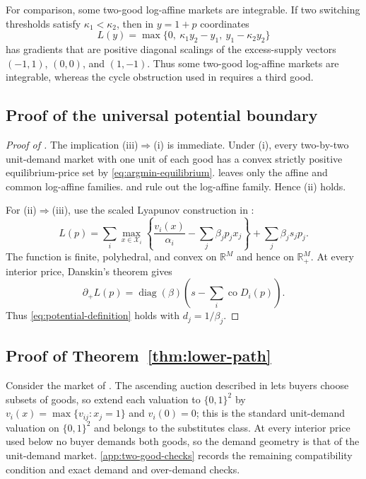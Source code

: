 \documentclass[11pt,a4paper,fleqn]{article}
\theoremstyle{plain}
\theoremstyle{definition}
\newcommand{\R}{\mathbb{R}}
\newcommand{\co}{\operatorname{co}}
\newcommand{\diag}{\operatorname{diag}}
\newcommand{\Xcal}{\mathcal{X}}
\begin{document}
For comparison, some two-good log-affine markets are integrable. If two switching thresholds satisfy $\kappa_1<\kappa_2$, then in $y=1+p$ coordinates
\[
L(y)=\max\{0,\ \kappa_1y_2-y_1,\ y_1-\kappa_2y_2\}
\]
has gradients that are positive diagonal scalings of the excess-supply vectors $(-1,1)$, $(0,0)$, and $(1,-1)$. Thus some two-good log-affine markets are integrable, whereas the cycle obstruction used in  requires a third good.

\subsection{Proof of the universal potential boundary}\label{subsec:potential-proof}

\begin{proof}[Proof of ]
The implication (iii)$\Rightarrow$(i) is immediate. Under (i), every two-by-two unit-demand market with one unit of each good has a convex strictly positive equilibrium-price set by \eqref{eq:argmin-equilibrium}.  leaves only the affine and common log-affine families.  and  rule out the log-affine family. Hence (ii) holds.

For (ii)$\Rightarrow$(iii), use the scaled Lyapunov construction in \citet[Theorem~6.4]{okisato2026}:
\begin{equation}\label{eq:affine-L}
L(p)=
\sum_i\max_{x\in\Xcal_i}
\left\{\frac{v_i(x)}{\alpha_i}-\sum_j\beta_jp_jx_j\right\}
+\sum_j\beta_js_jp_j.
\end{equation}
The function is finite, polyhedral, and convex on $\R^M$ and hence on $\R_+^M$. At every interior price, Danskin's theorem gives
\[
\partial_+ L(p)=\diag(\beta)
\left(s-\sum_i\co D_i(p)\right).
\]
Thus \eqref{eq:potential-definition} holds with $d_j=1/\beta_j$.
\end{proof}

\subsection{Proof of Theorem~\ref{thm:lower-path}}\label{subsec:lower-path-proof}

Consider the market of . The ascending auction described in  lets buyers choose subsets of goods, so extend each valuation to $\{0,1\}^2$ by $v_i(x)=\max\{v_{ij}:x_j=1\}$ and $v_i(0)=0$; this is the standard unit-demand valuation on $\{0,1\}^2$ and belongs to the substitutes class. At every interior price used below no buyer demands both goods, so the demand geometry is that of the unit-demand market. \ref{app:two-good-checks} records the remaining compatibility condition and exact demand and over-demand checks.
\end{document}
